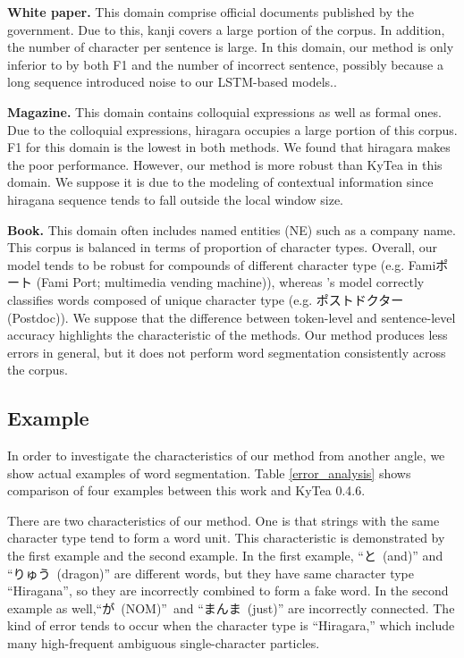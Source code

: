 \documentclass[11pt,letterpaper]{article}
\begin{document}
{\bf White paper.} This domain comprise official documents published by the government. Due to this, kanji covers a large portion of the corpus. In addition, the number of character per sentence is large. In this domain, our method is only inferior to 
 by both F1 and the number of incorrect sentence, possibly because a long sequence introduced noise to our LSTM-based models.. 

{\bf Magazine.} This domain contains colloquial expressions as well as formal ones.
Due to the colloquial expressions, hiragara occupies a large portion of this corpus. 
F1 for this domain is the lowest in both methods. 
We found that hiragara makes the poor performance. However, our method is more robust than KyTea in this domain. We suppose it is due to the modeling of contextual information since hiragana sequence tends to fall outside the local window size. 

{\bf  Book.}  This domain often includes named entities (NE) such as a company name. This corpus is balanced in terms of proportion of character types.
Overall, our model tends to be robust for compounds of different character type (e.g. Famiポート (Fami Port; multimedia vending machine)), whereas
's model correctly classifies words composed of unique character type (e.g. ポストドクター (Postdoc)). We suppose that the difference between token-level and sentence-level accuracy highlights the characteristic of the methods. Our method produces less errors in general, but it does not perform word segmentation consistently across the corpus.


\subsection{Example}
In order to investigate the characteristics of our method from another angle, we show actual examples of word segmentation. Table \ref {error_analysis} shows comparison of four examples between this work and KyTea 0.4.6.  


There are two characteristics of our method. One is that strings with the same character type tend to form a word unit. This characteristic is demonstrated by the first example and the second example. 
In the first example, \mbox{``と (and)''} and \mbox{``りゅう (dragon)''} are different words, but they have same character type ``Hiragana'', so they are incorrectly combined to form a fake word. In the second example as well,\mbox{``が (NOM)'' }and \mbox{``まんま (just)''} are incorrectly connected. The kind of error tends to occur when the character type is \mbox{``Hiragara,''} which include many high-frequent ambiguous single-character particles.
 
\end{document}
